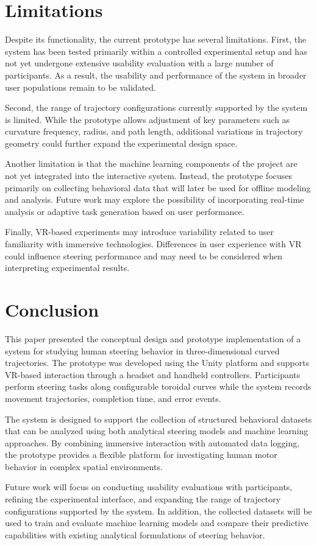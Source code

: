 \documentclass[sigconf]{acmart}
\begin{document}
\section{Limitations}

Despite its functionality, the current prototype has several limitations. First, the system has been tested primarily within a controlled experimental setup and has not yet undergone extensive usability evaluation with a large number of participants. As a result, the usability and performance of the system in broader user populations remain to be validated.

Second, the range of trajectory configurations currently supported by the system is limited. While the prototype allows adjustment of key parameters such as curvature frequency, radius, and path length, additional variations in trajectory geometry could further expand the experimental design space.

Another limitation is that the machine learning components of the project are not yet integrated into the interactive system. Instead, the prototype focuses primarily on collecting behavioral data that will later be used for offline modeling and analysis. Future work may explore the possibility of incorporating real-time analysis or adaptive task generation based on user performance.

Finally, VR-based experiments may introduce variability related to user familiarity with immersive technologies. Differences in user experience with VR could influence steering performance and may need to be considered when interpreting experimental results.

\section{Conclusion}

This paper presented the conceptual design and prototype implementation of a system for studying human steering behavior in three-dimensional curved trajectories. The prototype was developed using the Unity platform and supports VR-based interaction through a headset and handheld controllers. Participants perform steering tasks along configurable toroidal curves while the system records movement trajectories, completion time, and error events.

The system is designed to support the collection of structured behavioral datasets that can be analyzed using both analytical steering models and machine learning approaches. By combining immersive interaction with automated data logging, the prototype provides a flexible platform for investigating human motor behavior in complex spatial environments.

Future work will focus on conducting usability evaluations with participants, refining the experimental interface, and expanding the range of trajectory configurations supported by the system. In addition, the collected datasets will be used to train and evaluate machine learning models and compare their predictive capabilities with existing analytical formulations of steering behavior.


\end{document}
